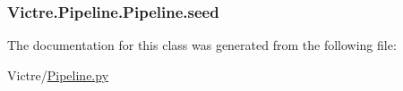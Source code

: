 \hypertarget{classVictre_1_1Pipeline_1_1Pipeline_aa252e7c9269262d7c97deb49112caef3}{
\subsubsection[{seed}]{\setlength{\rightskip}{0pt plus 5cm}Victre.\-Pipeline.\-Pipeline.\-seed}}\label{classVictre_1_1Pipeline_1_1Pipeline_aa252e7c9269262d7c97deb49112caef3}


The documentation for this class was generated from the following file\-:\begin{DoxyCompactItemize}
\item 
Victre/\hyperlink{Pipeline_8py}{Pipeline.\-py}\end{DoxyCompactItemize}
